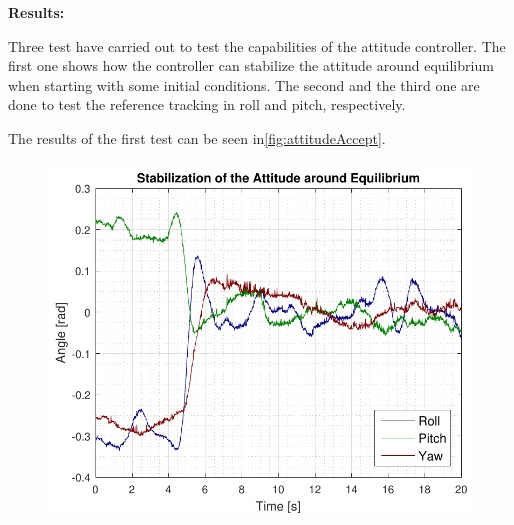 \textbf{Results:}

Three test have carried out to test the capabilities of the attitude controller. The first one shows how the controller can stabilize the attitude around equilibrium when starting with some initial conditions. The second and the third one are done to test the reference tracking in roll and pitch, respectively.

The results of the first test can be seen in\autoref{fig:attitudeAccept}.

\begin{minipage}{\linewidth}
    \begin{minipage}{0.46\linewidth}
        \begin{figure}[H]
            \includegraphics[scale=.55]{figures/attitudeAccept.pdf}
            \centering			
            \label{fig:AccattitudeAccept}
        \end{figure}
    \end{minipage}
    \hspace{0.03\linewidth}
    \begin{minipage}{0.46\linewidth}
        \begin{figure}[H]

\end{figure}
\end{minipage}
\end{minipage}
